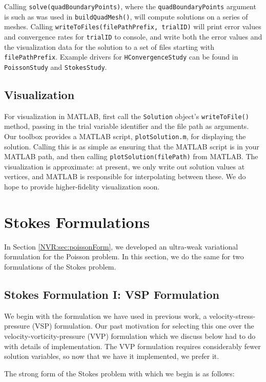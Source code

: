 Calling \verb=solve(quadBoundaryPoints)=, where the \verb=quadBoundaryPoints= argument is such as was used in \verb=buildQuadMesh()=, will compute solutions on a series of meshes.  Calling \verb=writeToFiles(filePathPrefix, trialID)= will print error values and convergence rates for \verb=trialID= to console, and write both the error values and the visualization data for the solution to a set of files starting with \verb=filePathPrefix=.  Example drivers for \verb=HConvergenceStudy= can be found in \verb=PoissonStudy= and \verb=StokesStudy=.

\subsection{Visualization}\label{NVR:sec:visualization}
For visualization in MATLAB, first call the \verb=Solution= object's \verb=writeToFile()= method, passing in the trial variable identifier and the file path as arguments.  Our toolbox provides a MATLAB script, \verb=plotSolution.m=, for displaying the solution.  Calling this is as simple as ensuring that the MATLAB script is in your MATLAB path, and then calling \verb=plotSolution(filePath)= from MATLAB.  The visualization is approximate: at present, we only write out solution values at vertices, and MATLAB is responsible for interpolating between these.  We do hope to provide higher-fidelity visualization soon.

\section{Stokes Formulations}\label{NVR:sec:stokesForm}
In Section \ref{NVR:sec:poissonForm}, we developed an ultra-weak variational formulation for the Poisson problem.  In this section, we do the same for two formulations of the Stokes problem.

\subsection{Stokes Formulation I: VSP Formulation}
We begin with the formulation we have used in previous work, a velocity-stress-pressure (VSP) formulation.  Our past motivation for selecting this one over the velocity-vorticity-pressure (VVP) formulation which we discuss below had to do with details of implementation.  The VVP formulation requires considerably fewer solution variables, so now that we have it implemented, we prefer it.

The strong form of the Stokes problem with which we begin is as follows:

